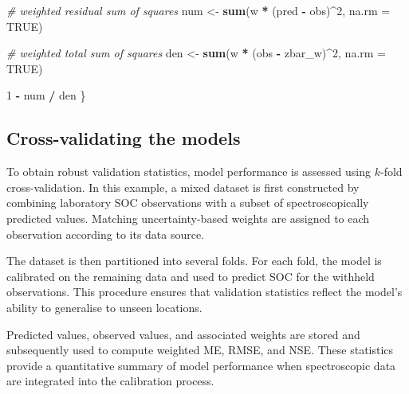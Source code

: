 \documentclass[
  10pt,
  b5paper,
  oneside]{book}
\newenvironment{Shaded}{\begin{snugshade}}{\end{snugshade}}
\newcommand{\AttributeTok}[1]{\textcolor[rgb]{0.13,0.29,0.53}{#1}}
\newcommand{\CommentTok}[1]{\textcolor[rgb]{0.56,0.35,0.01}{\textit{#1}}}
\newcommand{\ConstantTok}[1]{\textcolor[rgb]{0.56,0.35,0.01}{#1}}
\newcommand{\DecValTok}[1]{\textcolor[rgb]{0.00,0.00,0.81}{#1}}
\newcommand{\FunctionTok}[1]{\textcolor[rgb]{0.13,0.29,0.53}{\textbf{#1}}}
\newcommand{\NormalTok}[1]{#1}
\newcommand{\OtherTok}[1]{\textcolor[rgb]{0.56,0.35,0.01}{#1}}
\newcommand{\SpecialCharTok}[1]{\textcolor[rgb]{0.81,0.36,0.00}{\textbf{#1}}}
\begin{document}
\begin{Shaded}
\begin{Highlighting}[]
  \CommentTok{\# weighted residual sum of squares}
\NormalTok{  num }\OtherTok{\textless{}{-}} \FunctionTok{sum}\NormalTok{(w }\SpecialCharTok{*}\NormalTok{ (pred }\SpecialCharTok{{-}}\NormalTok{ obs)}\SpecialCharTok{\^{}}\DecValTok{2}\NormalTok{, }\AttributeTok{na.rm =} \ConstantTok{TRUE}\NormalTok{)}
  
  \CommentTok{\# weighted total sum of squares}
\NormalTok{  den }\OtherTok{\textless{}{-}} \FunctionTok{sum}\NormalTok{(w }\SpecialCharTok{*}\NormalTok{ (obs }\SpecialCharTok{{-}}\NormalTok{ zbar\_w)}\SpecialCharTok{\^{}}\DecValTok{2}\NormalTok{, }\AttributeTok{na.rm =} \ConstantTok{TRUE}\NormalTok{)}
  
  \DecValTok{1} \SpecialCharTok{{-}}\NormalTok{ num }\SpecialCharTok{/}\NormalTok{ den}
\NormalTok{\}}
\end{Highlighting}
\end{Shaded}

\subsection{Cross-validating the models}\label{cross-validating-the-models}

To obtain robust validation statistics, model performance is assessed using \(k\)-fold cross-validation. In this example, a mixed dataset is first constructed by combining laboratory SOC observations with a subset of spectroscopically predicted values. Matching uncertainty-based weights are assigned to each observation according to its data source.

The dataset is then partitioned into several folds. For each fold, the model is calibrated on the remaining data and used to predict SOC for the withheld observations. This procedure ensures that validation statistics reflect the model's ability to generalise to unseen locations.

Predicted values, observed values, and associated weights are stored and subsequently used to compute weighted ME, RMSE, and NSE. These statistics provide a quantitative summary of model performance when spectroscopic data are integrated into the calibration process.
\end{document}
